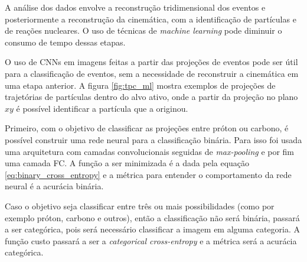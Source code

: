 \documentclass[a4paper,12pt,oneside]{book}
\begin{document}
\par A análise dos dados envolve a reconstrução tridimensional dos eventos e posteriormente a reconstrução da cinemática, com a identificação de partículas e de reações nucleares. O uso de técnicas de \textit{machine learning} pode diminuir o consumo de tempo dessas etapas.

\par O uso de CNNs em imagens feitas a partir das projeções de eventos pode ser útil para a classificação de eventos, sem a necessidade de reconstruir a cinemática em uma etapa anterior. A figura \ref{fig:tpc_ml} mostra exemplos de projeções de trajetórias de partículas dentro do alvo ativo, onde a partir da projeção no plano $xy$ é possível identificar a partícula que a originou.

\par Primeiro, com o objetivo de classificar as projeções entre próton ou carbono, é possível construir uma rede neural para a classificação binária. Para isso foi usada uma arquitetura com camadas convolucionais seguidas de \textit{max-pooling} e por fim uma camada FC\cite{KUCHERAML}. A função a ser minimizada é a dada pela equação \ref{eq:binary_cross_entropy} e a métrica para entender o comportamento da rede neural é a acurácia binária.

\par Caso o objetivo seja classificar entre três ou mais possibilidades (como por exemplo próton, carbono e outros), então a classificação não será binária, passará a ser categórica, pois será necessário classificar a imagem em alguma categoria. A função custo passará a ser a \textit{categorical cross-entropy} e a métrica será a acurácia categórica.
\end{document}
